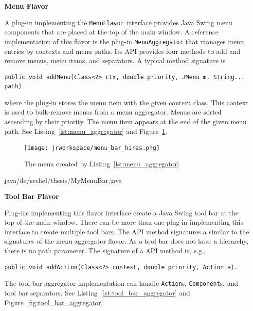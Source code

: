 \documentclass[Thesis.tex]{subfiles}
\begin{document}
{\bf Menu Flavor}

A plug-in implementing the {\tt MenuFlavor} interface provides {\sc Java Swing\TReg} menu 
components that are placed at the top of the main window. A reference implementation of this
flavor is the plug-in {\tt MenuAggregator} that manages menu entries by contexts and
menu paths. Its API provides four methods to add and remove menus, menu items, and
separators. A typical method signature is

\begin{lstlisting}[numbers=none]
	public void addMenu(Class<?> ctx, double priority, JMenu m, String... path)
\end{lstlisting}

where the plug-in stores the menu item with the given context class. This context is used to
bulk-remove menus from a menu aggregator. Menus are sorted ascending
by their priority. The menu item appears at the end of the given menu path. See 
Listing~\ref{lst:menu_aggregator} and Figure~\ref{fig:menu_aggregator}.


\begin{figure}[H]
\centering
\texttt{[image: jrworkspace/menu\_bar\_hires.png]}
\caption{The menu created by Listing~\ref{lst:menu_aggregator}}
\label{fig:menu_aggregator}
\end{figure}

 {java/de/sechel/thesis/MyMenuBar.java}

{\bf Tool Bar Flavor}

Plug-ins implementing this flavor interface create a {\sc Java Swing\TReg} tool bar at the top of the 
main window. There can be more than one plug-in implementing this interface to create multiple 
tool bars. The API method signatures a similar to the signatures of the menu aggregator flavor. As 
a tool bar does not have a hierarchy, there is no path parameter. The signature of a API method is, e.g.,

\begin{lstlisting}[numbers=none]
	public void addAction(Class<?> context, double priority, Action a).
\end{lstlisting}

The tool bar aggregator implementation can handle {\tt Action}s, {\tt Component}s, and tool bar
separators. See Listing~\ref{lst:tool_bar_aggregator} and Figure~\ref{fig:tool_bar_aggregator}.
\end{document}
